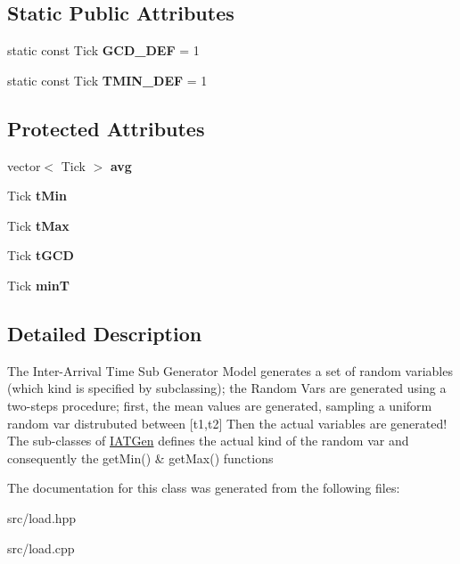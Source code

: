 \subsection*{Static Public Attributes}
\begin{DoxyCompactItemize}
\item 
static const Tick {\bfseries G\+C\+D\+\_\+\+D\+EF} = 1\hypertarget{classRTSim_1_1IATGen_a0f0ee92d78cecac3fdad85aa81140084}{}\label{classRTSim_1_1IATGen_a0f0ee92d78cecac3fdad85aa81140084}

\item 
static const Tick {\bfseries T\+M\+I\+N\+\_\+\+D\+EF} = 1\hypertarget{classRTSim_1_1IATGen_a96b35a3e47e16c0b9a932d7efe93839f}{}\label{classRTSim_1_1IATGen_a96b35a3e47e16c0b9a932d7efe93839f}

\end{DoxyCompactItemize}
\subsection*{Protected Attributes}
\begin{DoxyCompactItemize}
\item 
vector$<$ Tick $>$ {\bfseries avg}\hypertarget{classRTSim_1_1IATGen_ad6b8b68f94a22ab03bb6da88fd727994}{}\label{classRTSim_1_1IATGen_ad6b8b68f94a22ab03bb6da88fd727994}

\item 
Tick {\bfseries t\+Min}\hypertarget{classRTSim_1_1IATGen_a634c19807c3b081af58a4773662d014f}{}\label{classRTSim_1_1IATGen_a634c19807c3b081af58a4773662d014f}

\item 
Tick {\bfseries t\+Max}\hypertarget{classRTSim_1_1IATGen_ad0c9f416deab96fc5c53b3f9890db3d9}{}\label{classRTSim_1_1IATGen_ad0c9f416deab96fc5c53b3f9890db3d9}

\item 
Tick {\bfseries t\+G\+CD}\hypertarget{classRTSim_1_1IATGen_a826ade57b9101f34d575d406621eda7d}{}\label{classRTSim_1_1IATGen_a826ade57b9101f34d575d406621eda7d}

\item 
Tick {\bfseries minT}\hypertarget{classRTSim_1_1IATGen_a2a6a42ee3d3f648a8752b4d7009ca78f}{}\label{classRTSim_1_1IATGen_a2a6a42ee3d3f648a8752b4d7009ca78f}

\end{DoxyCompactItemize}


\subsection{Detailed Description}
The Inter-\/\+Arrival Time Sub Generator Model generates a set of random variables (which kind is specified by subclassing); the Random Vars are generated using a two-\/steps procedure; first, the mean values are generated, sampling a uniform random var distrubuted between \mbox{[}t1,t2\mbox{]} Then the actual variables are generated! The sub-\/classes of \hyperlink{classRTSim_1_1IATGen}{I\+A\+T\+Gen} defines the actual kind of the random var and consequently the get\+Min() \& get\+Max() functions 

The documentation for this class was generated from the following files\+:\begin{DoxyCompactItemize}
\item 
src/load.\+hpp\item 
src/load.\+cpp\end{DoxyCompactItemize}
